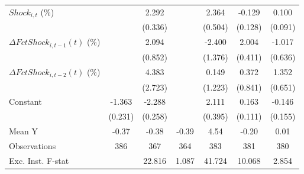 {\begin{tabular}{l*{6}{c}}
\addlinespace
$ Shock_{i,t}$ (\%) &                     &       2.292\sym{***}&                     &       2.364\sym{***}&      -0.129         &       0.100         \\
                    &                     &     (0.336)         &                     &     (0.504)         &     (0.128)         &     (0.091)         \\
\addlinespace
$ \Delta FctShock_{i,t-1}(t)$ (\%)&                     &       2.094\sym{**} &                     &      -2.400\sym{*}  &       2.004\sym{***}&      -1.017         \\
                    &                     &     (0.852)         &                     &     (1.376)         &     (0.411)         &     (0.636)         \\
\addlinespace
$ \Delta FctShock_{i,t-2}(t)$ (\%)&                     &       4.383         &                     &       0.149         &       0.372         &       1.352\sym{**} \\
                    &                     &     (2.723)         &                     &     (1.223)         &     (0.841)         &     (0.651)         \\
\addlinespace
Constant            &      -1.363\sym{***}&      -2.288\sym{***}&                     &       2.111\sym{***}&       0.163         &      -0.146         \\
                    &     (0.231)         &     (0.258)         &                     &     (0.395)         &     (0.111)         &     (0.155)         \\
\midrule
Mean Y              &       -0.37         &       -0.38         &       -0.39         &        4.54         &       -0.20         &        0.01         \\
Observations        &         386         &         367         &         364         &         383         &         381         &         380         \\
Exc. Inst. F-stat   &                     &      22.816         &       1.087         &      41.724         &      10.068         &       2.854         \\
\bottomrule
\end{tabular}
}
